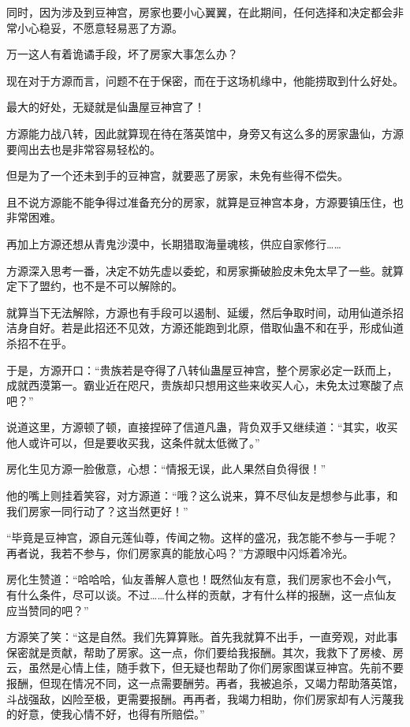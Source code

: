 \begin{this_body}
同时，因为涉及到豆神宫，房家也要小心翼翼，在此期间，任何选择和决定都会非常小心稳妥，不愿意轻易恶了方源。

万一这人有着诡谲手段，坏了房家大事怎么办？

现在对于方源而言，问题不在于保密，而在于这场机缘中，他能捞取到什么好处。

最大的好处，无疑就是仙蛊屋豆神宫了！

方源能力战八转，因此就算现在待在落英馆中，身旁又有这么多的房家蛊仙，方源要闯出去也是非常容易轻松的。

但是为了一个还未到手的豆神宫，就要恶了房家，未免有些得不偿失。

且不说方源能不能争得过准备充分的房家，就算是豆神宫本身，方源要镇压住，也非常困难。

再加上方源还想从青鬼沙漠中，长期猎取海量魂核，供应自家修行……

方源深入思考一番，决定不妨先虚以委蛇，和房家撕破脸皮未免太早了一些。就算定下了盟约，也不是不可以解除的。

就算当下无法解除，方源也有手段可以遏制、延缓，然后争取时间，动用仙道杀招洁身自好。若是此招还不见效，方源还能跑到北原，借取仙蛊不和在乎，形成仙道杀招不在乎。

于是，方源开口：“贵族若是夺得了八转仙蛊屋豆神宫，整个房家必定一跃而上，成就西漠第一。霸业近在咫尺，贵族却只想用这些来收买人心，未免太过寒酸了点吧？”

说道这里，方源顿了顿，直接捏碎了信道凡蛊，背负双手又继续道：“其实，收买他人或许可以，但是要收买我，这条件就太低微了。”

房化生见方源一脸傲意，心想：“情报无误，此人果然自负得很！”

他的嘴上则挂着笑容，对方源道：“哦？这么说来，算不尽仙友是想参与此事，和我们房家一同行动了？这当然更好！”

“毕竟是豆神宫，源自元莲仙尊，传闻之物。这样的盛况，我怎能不参与一手呢？再者说，我若不参与，你们房家真的能放心吗？”方源眼中闪烁着冷光。

房化生赞道：“哈哈哈，仙友善解人意也！既然仙友有意，我们房家也不会小气，有什么条件，尽可以谈。不过……什么样的贡献，才有什么样的报酬，这一点仙友应当赞同的吧？”

方源笑了笑：“这是自然。我们先算算账。首先我就算不出手，一直旁观，对此事保密就是贡献，帮助了房家。这一点，你们要给我报酬。其次，我救下了房棱、房云，虽然是心情上佳，随手救下，但无疑也帮助了你们房家图谋豆神宫。先前不要报酬，但现在情况不同，这一点需要酬劳。再者，我被追杀，又竭力帮助落英馆，斗战强敌，凶险至极，更需要报酬。再再者，我竭力相助，你们房家却有人污蔑我的好意，使我心情不好，也得有所赔偿。”


\end{this_body}
